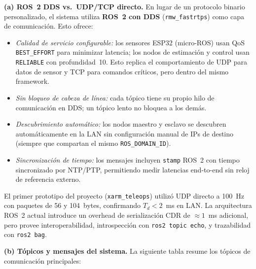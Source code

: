 \documentclass[journal,10pt,twoside]{IEEEtran}
\begin{document}
\textbf{(a) ROS~2 DDS vs.\ UDP/TCP directo.}
En lugar de un protocolo binario personalizado, el sistema utiliza
\textbf{ROS~2 con DDS} (\texttt{rmw\_fastrtps}) como capa de
comunicación. Esto ofrece:
\begin{itemize}
  \item \textit{Calidad de servicio configurable:} los sensores ESP32
        (micro-ROS) usan QoS \texttt{BEST\_EFFORT} para minimizar
        latencia; los nodos de estimación y control usan
        \texttt{RELIABLE} con profundidad~10. Esto replica el
        comportamiento de UDP para datos de sensor y TCP para
        comandos críticos, pero dentro del mismo framework.
  \item \textit{Sin bloqueo de cabeza de línea:} cada tópico tiene su
        propio hilo de comunicación en DDS; un tópico lento no bloquea
        a los demás.
  \item \textit{Descubrimiento automático:} los nodos maestro y esclavo
        se descubren automáticamente en la LAN sin configuración manual
        de IPs de destino (siempre que compartan el mismo
        \texttt{ROS\_DOMAIN\_ID}).
  \item \textit{Sincronización de tiempo:} los mensajes incluyen
        \texttt{stamp} ROS~2 con tiempo sincronizado por NTP/PTP,
        permitiendo medir latencias end-to-end sin reloj de referencia
        externo.
\end{itemize}
El primer prototipo del proyecto (\texttt{xarm\_teleops}) utilizó
UDP directo a 100~Hz con paquetes de 56 y 104~bytes, confirmando
$T_d < 2$~ms en LAN. La arquitectura ROS~2 actual introduce un
overhead de serialización CDR de $\approx 1$~ms adicional, pero
provee interoperabilidad, introspección con \texttt{ros2 topic echo},
y trazabilidad con \texttt{ros2 bag}.

\textbf{(b) Tópicos y mensajes del sistema.}
La siguiente tabla resume los tópicos de comunicación principales:
\end{document}
